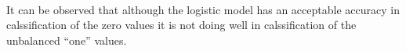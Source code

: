\documentclass[11pt]{article}
\begin{document}
    \begin{center}
    \end{center}
    { \hspace*{\fill} \\}
    
    It can be observed that although the logistic model has an acceptable
accuracy in calssification of the zero values it is not doing well in
calssification of the unbalanced ``one'' values.


    
    
    
    
\end{document}
